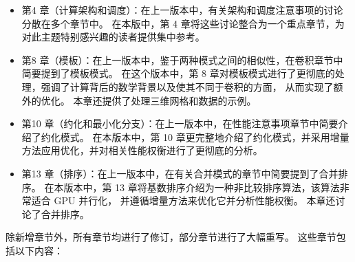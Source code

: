 \begin{itemize}
	\item 第4 章（计算架构和调度）：在上一版本中，有关架构和调度注意事项的讨论分散在多个章节中。 
		在本版中，第 4 章将这些讨论整合为一个重点章节，为对此主题特别感兴趣的读者提供集中参考。

	\item 第8 章（模板）：在上一版本中，鉴于两种模式之间的相似性，在卷积章节中简要提到了模板模式。 
		在这个版本中，第 8 章对模板模式进行了更彻底的处理，强调了计算背后的数学背景以及使其不同于卷积的方面，
		从而实现了额外的优化。 本章还提供了处理三维网格和数据的示例。

	\item 第10 章（约化和最小化分支）：在上一版本中，在性能注意事项章节中简要介绍了约化模式。 
		在本版本中，第 10 章更完整地介绍了约化模式，并采用增量方法应用优化，并对相关性能权衡进行了更彻底的分析。

	\item 第13 章（排序）：在上一版本中，在有关合并模式的章节中简要提到了合并排序。 
		在本版本中，第 13 章将基数排序介绍为一种非比较排序算法，该算法非常适合 GPU 并行化，
		并遵循增量方法来优化它并分析性能权衡。 本章还讨论了合并排序。
\end{itemize}

除新增章节外，所有章节均进行了修订，部分章节进行了大幅重写。 这些章节包括以下内容：

